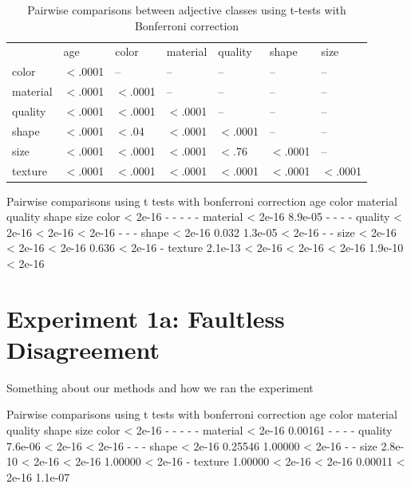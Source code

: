 \documentclass{pnastwo}
\begin{document}
\begin{article}
\begin{materials}
\begin{table}
\caption{Pairwise comparisons between adjective classes using t-tests with Bonferroni correction}

\begin{tabular}{l l l l l l l}
       &  age & color & material & quality & shape & size\\
color &     $<$.0001 &    --   &    --   &   -- &   --  & --\\
material &  $<$.0001 &  $<$.0001 &      --  &    -- &   -- &  --\\
quality &   $<$.0001 & $<$.0001 &         $<$.0001 &      --  &  -- &  --\\
shape &     $<$.0001 & $<$.04 &        $<$.0001 &  $<$.0001 &    -- &  --\\
size &      $<$.0001 & $<$.0001 &        $<$.0001 &  $<$.76 &    $<$.0001 &   --\\
texture &   $<$.0001 & $<$.0001 &       $<$.0001 &  $<$.0001 &    $<$.0001 &    $<$.0001
\end{tabular}
\label{tab:bonferronicorpus}
\end{table}

Pairwise comparisons using t tests with bonferroni correction
         age     color   material quality shape   size   
         color    < 2e-16 -       -        -       -       -      
         material < 2e-16 8.9e-05 -        -       -       -      
         quality  < 2e-16 < 2e-16 < 2e-16  -       -       -      
         shape    < 2e-16 0.032   1.3e-05  < 2e-16 -       -      
         size     < 2e-16 < 2e-16 < 2e-16  0.636   < 2e-16 -      
         texture  2.1e-13 < 2e-16 < 2e-16  < 2e-16 1.9e-10 < 2e-16

\section{Experiment 1a: Faultless Disagreement}
Something about our methods and how we ran the experiment


Pairwise comparisons using t tests with bonferroni correction
		         age     color   material quality shape   size   
         color    < 2e-16 -       -        -       -       -      
         material < 2e-16 0.00161 -        -       -       -      
         quality  7.6e-06 < 2e-16 < 2e-16  -       -       -      
         shape    < 2e-16 0.25546 1.00000  < 2e-16 -       -      
         size     2.8e-10 < 2e-16 < 2e-16  1.00000 < 2e-16 -      
         texture  1.00000 < 2e-16 < 2e-16  0.00011 < 2e-16 1.1e-07


\end{materials}
\end{article}
\end{document}
